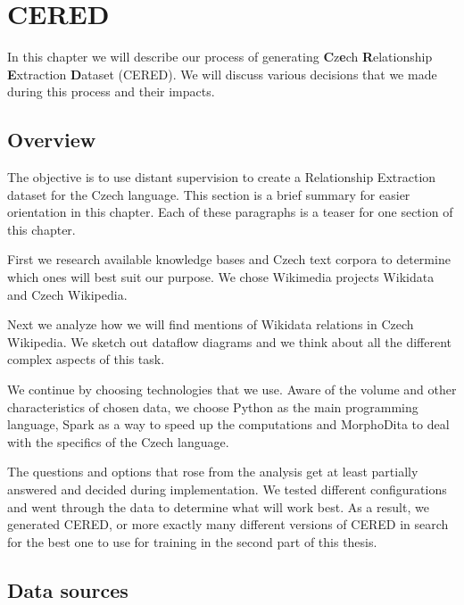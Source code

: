 \chapter{CERED}

In this chapter we will describe our process of generating \textbf{C}z\textbf{e}ch \textbf{R}elationship \textbf{E}xtraction \textbf{D}ataset (CERED). We will discuss various decisions that we made during this process and their impacts.




\section{Overview}

The objective is to use distant supervision to create a Relationship Extraction dataset for the Czech language. This section is a brief summary for easier orientation in this chapter. Each of these paragraphs is a teaser for one section of this chapter.

First we research available knowledge bases and Czech text corpora to determine which ones will best suit our purpose. We chose Wikimedia projects Wikidata and Czech Wikipedia.

Next we analyze how we will find mentions of Wikidata relations in Czech Wikipedia. We sketch out dataflow diagrams and we think about all the different complex aspects of this task.

We continue by choosing technologies that we use. Aware of the volume and other characteristics of chosen data, we choose Python as the main programming language, Spark as a way to speed up the computations and MorphoDita to deal with the specifics of the Czech language.

The questions and options that rose from the analysis get at least partially answered and decided during implementation. We tested different configurations and went through the data to determine what will work best. As a result, we generated CERED, or more exactly many different versions of CERED in search for the best one to use for training in the second part of this thesis. 




\section{Data sources}

